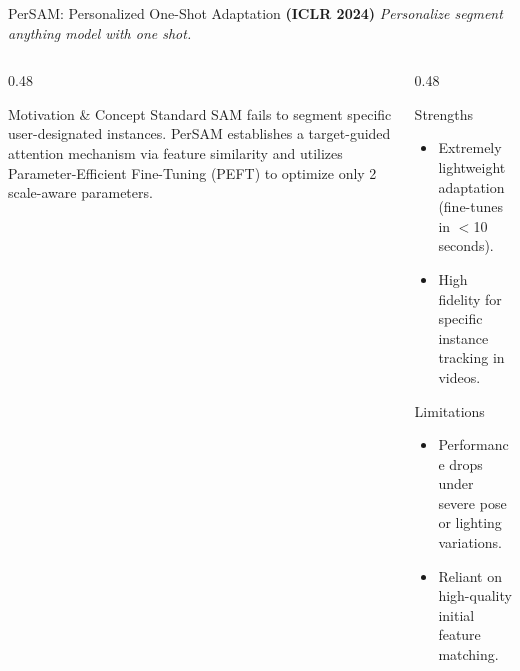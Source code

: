 \documentclass[aspectratio=169, 10pt]{beamer}
\begin{document}
\begin{frame}{PerSAM: Personalized One-Shot Adaptation \textbf{(ICLR 2024)}}
\textit{Personalize segment anything model with one shot.}
    \begin{columns}[T]
        \begin{column}{0.48\textwidth}
            \begin{block}{Motivation \& Concept \cite{zhang2024persam}}
                Standard SAM fails to segment specific user-designated instances. PerSAM establishes a target-guided attention mechanism via feature similarity and utilizes Parameter-Efficient Fine-Tuning (PEFT) to optimize only 2 scale-aware parameters.
            \end{block}
        \end{column}
        
        \begin{column}{0.48\textwidth}
            \begin{exampleblock}{Strengths}
                \begin{itemize}
                    \item[\textcolor{green!70!black}{\ding{51}}] Extremely lightweight adaptation (fine-tunes in $<$10 seconds).
                    \item[\textcolor{green!70!black}{\ding{51}}] High fidelity for specific instance tracking in videos.
                \end{itemize}
            \end{exampleblock}
            \begin{alertblock}{Limitations}
                \begin{itemize}
                    \item[\textcolor{red}{\ding{55}}] Performance drops under severe pose or lighting variations.
                    \item[\textcolor{red}{\ding{55}}] Reliant on high-quality initial feature matching.
                \end{itemize}
            \end{alertblock}
        \end{column}
    \end{columns}
\end{frame}
\end{document}
